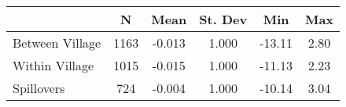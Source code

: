 \begin{tabular}{l*{5}{c}}\hline&\multicolumn{1}{c}{N}&\multicolumn{1}{c}{Mean}&\multicolumn{1}{c}{St. Dev}&\multicolumn{1}{c}{Min}&\multicolumn{1}{c}{Max}\\ \hline 
Between Village & 1163 & -0.013 & 1.000 & -13.11 & 2.80 \\
Within Village & 1015 & -0.015 & 1.000 & -11.13 & 2.23 \\
Spillovers & 724 & -0.004 & 1.000 & -10.14 & 3.04 \\
\hline \end{tabular}
